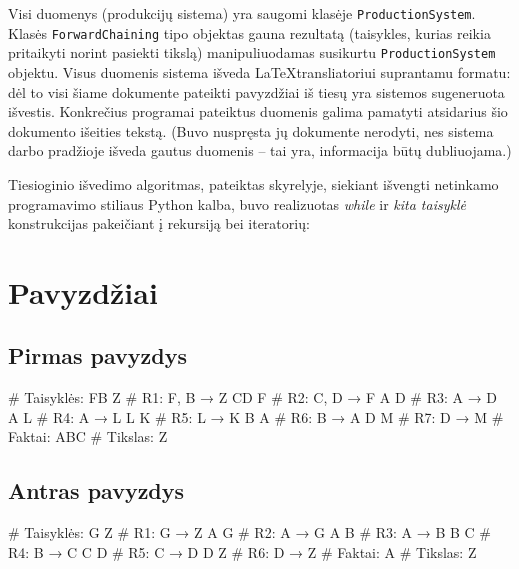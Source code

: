 \begin{sloppypar}
Visi duomenys (produkcijų sistema) yra saugomi klasėje
\verb|ProductionSystem|. Klasės \verb|ForwardChaining| tipo objektas
gauna rezultatą (taisykles, kurias reikia pritaikyti norint pasiekti
tikslą) manipuliuodamas susikurtu \verb|ProductionSystem| objektu.
Visus duomenis sistema išveda \LaTeX transliatoriui suprantamu formatu:
dėl to visi šiame dokumente pateikti pavyzdžiai iš tiesų yra
sistemos sugeneruota išvestis. Konkrečius programai pateiktus duomenis
galima pamatyti atsidarius šio dokumento išeities tekstą. (Buvo
nuspręsta jų dokumente nerodyti, nes sistema darbo pradžioje išveda
gautus duomenis – tai yra, informacija būtų dubliuojama.)
\end{sloppypar}

Tiesioginio išvedimo algoritmas, pateiktas 
skyrelyje, siekiant išvengti netinkamo programavimo stiliaus Python
kalba, buvo realizuotas \emph{while} ir \emph{kita taisyklė}
konstrukcijas pakeičiant į rekursiją bei iteratorių:


\section{Pavyzdžiai}

\subsection{Pirmas pavyzdys}

\begin{pythonaienv}[fc]
# Taisyklės:
FB Z                                    # R1: F, B → Z
CD F                                    # R2: C, D → F
A D                                     # R3: A → D
A L                                     # R4: A → L
L K                                     # R5: L → K
B A                                     # R6: B → A
D M                                     # R7: D → M
# Faktai:
ABC
# Tikslas:
Z
\end{pythonaienv}

\subsection{Antras pavyzdys}

\begin{pythonaienv}[fc]
# Taisyklės:
G Z                                     # R1: G → Z
A G                                     # R2: A → G
A B                                     # R3: A → B
B C                                     # R4: B → C
C D                                     # R5: C → D
D Z                                     # R6: D → Z
# Faktai:
A
# Tikslas:
Z
\end{pythonaienv}

